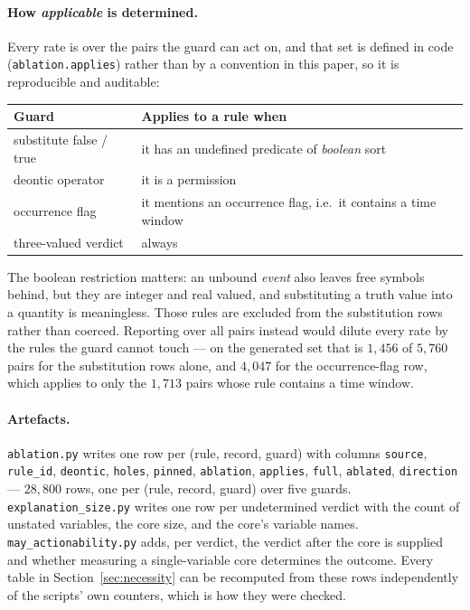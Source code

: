 \documentclass{article}
\begin{document}
\paragraph{How \emph{applicable} is determined.}
Every rate is over the pairs the guard can act on, and that set is defined in
code (\texttt{ablation.applies}) rather than by a convention in this paper, so
it is reproducible and auditable:
\begin{center}
\begin{tabular}{ll}
  \toprule
  Guard & Applies to a rule when \\
  \midrule
  substitute \textsf{false} / \textsf{true}
    & it has an undefined predicate of \emph{boolean} sort \\
  deontic operator
    & it is a permission \\
  occurrence flag
    & it mentions an occurrence flag, i.e.\ it contains a time window \\
  three-valued verdict
    & always \\
  \bottomrule
\end{tabular}
\end{center}
The boolean restriction matters: an unbound \emph{event} also leaves free
symbols behind, but they are integer and real valued, and substituting a truth
value into a quantity is meaningless. Those rules are excluded from the
substitution rows rather than coerced. Reporting over all pairs instead would
dilute every rate by the rules the guard cannot touch --- on the generated set
that is $1{,}456$ of $5{,}760$ pairs for the substitution rows alone, and
$4{,}047$ for the occurrence-flag row, which applies to only the $1{,}713$
pairs whose rule contains a time window.

\paragraph{Artefacts.}
\texttt{ablation.py} writes one row per (rule, record, guard) with columns
\texttt{source}, \texttt{rule\_id}, \texttt{deontic}, \texttt{holes},
\texttt{pinned}, \texttt{ablation}, \texttt{applies}, \texttt{full},
\texttt{ablated}, \texttt{direction} --- $28{,}800$ rows, one per
(rule, record, guard) over five guards.
\texttt{explanation\_size.py} writes one row per undetermined verdict with the
count of unstated variables, the core size, and the core's variable names.
\texttt{may\_actionability.py} adds, per verdict, the verdict after the core is
supplied and whether measuring a single-variable core determines the outcome.
Every table in Section~\ref{sec:necessity} can be recomputed from these rows
independently of the scripts' own counters, which is how they were checked.
\end{document}

